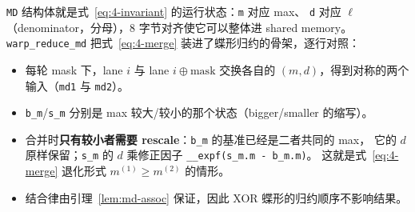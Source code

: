 \texttt{MD} 结构体就是式~\ref{eq:4-invariant} 的运行状态：\texttt{m} 对应 max、
\texttt{d} 对应 $\ell$（denominator，分母），8 字节对齐使它可以整体进 shared memory。
\texttt{warp\_\allowbreak{}reduce\_\allowbreak{}md} 把式~\ref{eq:4-merge} 装进了蝶形归约的骨架，逐行对照：
\begin{itemize}
  \item 每轮 mask 下，lane $i$ 与 lane $i \oplus \text{mask}$ 交换各自的
        $(m, d)$，得到对称的两个输入（\texttt{md1} 与 \texttt{md2}）。
  \item \texttt{b\_m}/\texttt{s\_m} 分别是 max 较大/较小的那个状态（bigger/smaller 的缩写）。
  \item 合并时\textbf{只有较小者需要 rescale}：\texttt{b\_m} 的基准已经是二者共同的 max，
        它的 $d$ 原样保留；\texttt{s\_m} 的 $d$ 乘修正因子
        \texttt{\_\allowbreak{}\_\allowbreak{}expf\allowbreak{}(s\_\allowbreak{}m.\allowbreak{}m - b\_\allowbreak{}m.\allowbreak{}m)}。
        这就是式~\ref{eq:4-merge} 退化形式 $m^{(1)} \ge m^{(2)}$ 的情形。
  \item 结合律由引理~\ref{lem:md-assoc} 保证，因此 XOR 蝶形的归约顺序不影响结果。
\end{itemize}

